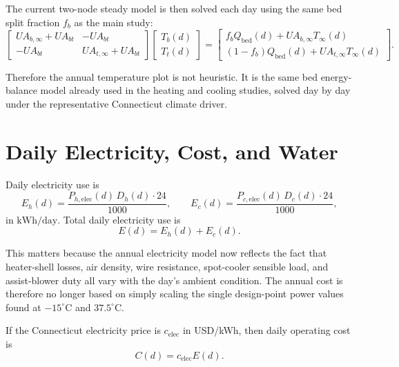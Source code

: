 \documentclass{article}
\begin{document}
The current two-node steady model is then solved each day using the same bed
split fraction $f_b$ as the main study:
\begin{equation}
\begin{bmatrix}
UA_{b,\infty} + UA_{bt} & -UA_{bt} \\
-UA_{bt} & UA_{t,\infty} + UA_{bt}
\end{bmatrix}
\begin{bmatrix}
T_b(d) \\ T_t(d)
\end{bmatrix}
=
\begin{bmatrix}
f_b Q_{\mathrm{bed}}(d) + UA_{b,\infty}T_\infty(d) \\
(1-f_b) Q_{\mathrm{bed}}(d) + UA_{t,\infty}T_\infty(d)
\end{bmatrix}.
\end{equation}

Therefore the annual temperature plot is not heuristic. It is the same bed
energy-balance model already used in the heating and cooling studies, solved
day by day under the representative Connecticut climate driver.

\section{Daily Electricity, Cost, and Water}

Daily electricity use is
\begin{equation}
E_h(d) = \frac{P_{h,\mathrm{elec}}(d)\, D_h(d) \cdot 24}{1000},
\qquad
E_c(d) = \frac{P_{c,\mathrm{elec}}(d)\, D_c(d) \cdot 24}{1000},
\end{equation}
in $\mathrm{kWh/day}$. Total daily electricity use is
\begin{equation}
E(d) = E_h(d) + E_c(d).
\end{equation}

This matters because the annual electricity model now reflects the fact that
heater-shell losses, air density, wire resistance, spot-cooler sensible load,
and assist-blower duty all vary with the day's ambient condition. The annual
cost is therefore no longer based on simply scaling the single design-point
power values found at $-15^\circ\mathrm{C}$ and $37.5^\circ\mathrm{C}$.

If the Connecticut electricity price is $c_{\mathrm{elec}}$ in
USD/kWh, then daily operating cost is
\begin{equation}
C(d) = c_{\mathrm{elec}} E(d).
\end{equation}
\end{document}
